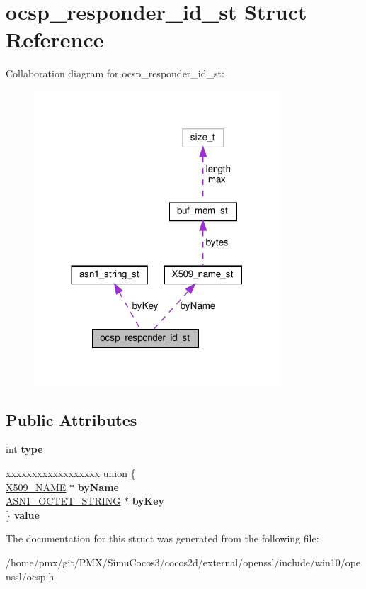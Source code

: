 \hypertarget{structocsp__responder__id__st}{}\section{ocsp\+\_\+responder\+\_\+id\+\_\+st Struct Reference}
\label{structocsp__responder__id__st}


Collaboration diagram for ocsp\+\_\+responder\+\_\+id\+\_\+st\+:
\nopagebreak
\begin{figure}[H]
\begin{center}
\leavevmode
\includegraphics[width=260pt]{structocsp__responder__id__st__coll__graph}
\end{center}
\end{figure}
\subsection*{Public Attributes}
\begin{DoxyCompactItemize}
\item 
\mbox{\label{structocsp__responder__id__st_a77bb04f705903d3d2e8c3b5671d6adc6}} 
int {\bfseries type}
\item 
\mbox{\label{structocsp__responder__id__st_aff652a66502a9857849f7472a7d63e32}} 
\begin{tabbing}
xx\=xx\=xx\=xx\=xx\=xx\=xx\=xx\=xx\=\kill
union \{\\
\>\hyperlink{structX509__name__st}{X509\_NAME} $\ast$ {\bfseries byName}\\
\>\hyperlink{structasn1__string__st}{ASN1\_OCTET\_STRING} $\ast$ {\bfseries byKey}\\
\} {\bfseries value}\\

\end{tabbing}\end{DoxyCompactItemize}


The documentation for this struct was generated from the following file\+:\begin{DoxyCompactItemize}
\item 
/home/pmx/git/\+P\+M\+X/\+Simu\+Cocos3/cocos2d/external/openssl/include/win10/openssl/ocsp.\+h\end{DoxyCompactItemize}
